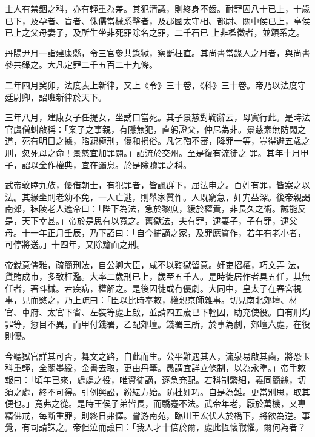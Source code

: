 \begin{pinyinscope}
 士人有禁錮之科，亦有輕重為差。其犯清議，則終身不齒。耐罪囚八十已上，十歲已下，及孕者、盲者、侏儒當械系擊者，及郡國太守相、都尉、關中侯已上，亭侯已上之父母妻子，及所生坐非死罪除名之罪，二千石已
 上非檻徵者，並頌系之。



 丹陽尹月一詣建康縣，令三官參共錄獄，察斷枉直。其尚書當錄人之月者，與尚書參共錄之。大凡定罪二千五百二十九條。



 二年四月癸卯，法度表上新律，又上《令》三十卷，《科》三十卷。帝乃以法度守廷尉卿，詔班新律於天下。



 三年八月，建康女子任提女，坐誘口當死。其子景慈對鞫辭云，母實行此。是時法官虞僧虯啟稱：「案子之事親，有隱無犯，直躬證父，仲尼為非。景慈素無防閑之道，死有明目之據，陷親極刑，傷和損俗。凡乞鞫不審，降罪一等，豈得避五歲之刑，忽死母之命！景慈宜加罪闢。」詔流於交州。至是復有流徒之
 罪。其年十月甲子，詔以金作權典，宜在蠲息。於是除贖罪之科。



 武帝敦睦九族，優借朝士，有犯罪者，皆諷群下，屈法申之。百姓有罪，皆案之以法。其緣坐則老幼不免，一人亡逃，則舉家質作。人既窮急，奸宄益深。後帝親謁南郊，秣陵老人遮帝曰：「陛下為法，急於黎庶，緩於權貴，非長久之術。誠能反是，天下幸甚。」帝於是思有以寬之。舊獄法，夫有罪，逮妻子，子有罪，逮父母。十一年正月壬辰，乃下詔曰：「自今捕謫之家，及罪應質作，若年有老小者，可停將送。」十四年，又除黵面之刑。



 帝銳意儒雅，疏簡刑法，自公卿大臣，咸不以鞫獄留意。奸吏招權，巧文弄
 法，貨賄成市，多致枉濫。大率二歲刑已上，歲至五千人。是時徙居作者具五任，其無任者，著斗械。若疾病，權解之。是後囚徒或有優劇。大同中，皇太子在春宮視事，見而愍之，乃上疏曰：「臣以比時奉敕，權親京師雜事。切見南北郊壇、材官、車府、太官下省、左裝等處上啟，並請四五歲已下輕囚，助充使役。自有刑均罪等，愆目不異，而甲付錢署，乙配郊壇。錢署三所，於事為劇，郊壇六處，在役則優。



 今聽獄官詳其可否，舞文之路，自此而生。公平難遇其人，流泉易啟其齒，將恐玉科重輕，全關墨綬，金書去取，更由丹筆。愚謂宜詳立條制，以為永準。」帝手敕
 報曰：「頃年已來，處處之役，唯資徒謫，逐急充配。若科制繁細，義同簡絲，切須之處，終不可得。引例興訟，紛紜方始。防杜奸巧。自是為難。更當別思，取其便也。」竟弗之從。是時王侯子弟皆長，而驕蹇不法。武帝年老，厭於萬機，又專精佛戒，每斷重罪，則終日弗懌。嘗游南苑，臨川王宏伏人於橋下，將欲為逆。事覺，有司請誅之。帝但泣而讓曰：「我人才十倍於爾，處此恆懷戰懼。爾何為者？




\end{pinyinscope}
